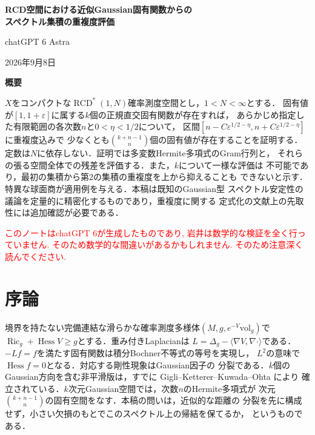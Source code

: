 \documentclass[12pt]{amsart}
\theoremstyle{definition}
\theoremstyle{remark}
\numberwithin{equation}{section}
\DeclareMathOperator{\Ric}{Ric}
\newcommand{\xr}[1]{\textcolor{red}{#1}}
\DeclareMathOperator{\Hess}{Hess}
\newcommand{\RCD}{\operatorname{RCD}^{*}}
\newcommand{\eps}{\varepsilon}
\theoremstyle{plain}
\newcommand{\ns}{en}
\begin{document}
\newpage
\renewcommand{\ns}{ja}
\setcounter{section}{0}
\setcounter{thm}{0}
\setcounter{equation}{0}
\setcounter{footnote}{0}
\renewcommand{\proofname}{証明}
\renewcommand{\refname}{参考文献}
\begin{center}
{\Large\bfseries RCD空間における近似Gaussian固有関数からの\\
スペクトル集積の重複度評価\par}
\vspace{0.6em}
{\normalsize chatGPT 6 Astra\par}
\vspace{0.3em}
{\small 2026年9月8日\par}
\end{center}
\begin{center}\bfseries 概要\end{center}
$X$をコンパクトな$\RCD(1,N)$確率測度空間とし，$1<N<\infty$とする．
固有値が$[1,1+\eps]$に属する$k$個の正規直交固有関数が存在すれば，
あらかじめ指定した有限範囲の各次数$n$と$0<\eta<1/2$について，
区間$[n-C\eps^{1/2-\eta},n+C\eps^{1/2-\eta}]$に重複度込みで
少なくとも$\binom{k+n-1}{n}$個の固有値が存在することを証明する．
定数は$N$に依存しない．証明では多変数Hermite多項式のGram行列と，
それらの張る空間全体での残差を評価する．また，$k$について一様な評価は
不可能であり，最初の集積から第2の集積の重複度を上から抑えることも
できないと示す．特異な球面商が適用例を与える．本稿は既知のGaussian型
スペクトル安定性の議論を定量的に精密化するものであり，重複度に関する
定式化の文献上の先取性には追加確認が必要である．

\xr{このノートはchatGPT 6が生成したものであり, 岩井は数学的な検証を全く行っていません. そのため数学的な間違いがあるかもしれません. そのため注意深く読んでください.}
\section{序論}
境界を持たない完備連結な滑らかな確率測度多様体$(M,g,e^{-V}\mathrm{vol}_g)$で
$\Ric_g+\Hess V\geq g$とする．重み付きLaplacianは
$L=\Delta_g-\langle\nabla V,\nabla\cdot\rangle$である．
$-Lf=f$を満たす固有関数は積分Bochner不等式の等号を実現し，
$L^2$の意味で$\Hess f=0$となる．対応する剛性現象はGaussian因子の
分裂である．$k$個のGaussian方向を含む非平滑版は，すでに
Gigli--Ketterer--Kuwada--Ohta \cite[Theorem 1.1]{ja:GKKO}により
確立されている．$k$次元Gaussian空間では，次数$n$のHermite多項式が
次元$\binom{k+n-1}{n}$の固有空間をなす．本稿の問いは，近似的な距離の
分裂を先に構成せず，小さい欠損のもとでこのスペクトル上の帰結を保てるか，
というものである．
\end{document}

